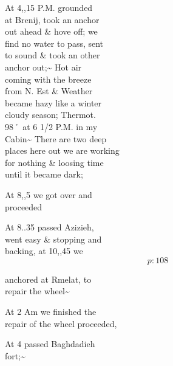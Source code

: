 \documentclass{report}
\begin{document}
	\par{
 	At 4,,15 P.M. grounded\ \\at Brenij, took an anchor\ \\out ahead \& hove off; we\ \\find no water to pass, sent\ \\to sound \& took an other\ \\anchor out;\~{} Hot air\ \\coming with the breeze\ \\from N. Est \& Weather\ \\became hazy like a winter\ \\cloudy season; Thermot.\ \\98˚ at 6 1/2 P.M. in my\ \\Cabin\~{} There are two deep\ \\places here out we are working\ \\for nothing \& loosing time\ \\until it became dark;\ \\
	}

	\par{
 	At 8,,5 we got over and\ \\proceeded\ \\
	}

	\par{
 	At 8..35 passed Azizieh,\ \\went easy \& stopping and\ \\backing, at 10,,45 we\ \\
  \[p: 108 \]

	}





	\par{
 	anchored at Rmelat, to\ \\repair the wheel\~{}\ \\
	}

	\par{
 	At 2 Am we finished the\ \\repair of the wheel proceeded,\ \\
	}

	\par{
 	At 4 passed Baghdadieh\ \\fort;\~{}\ \\
	}
\end{document}
